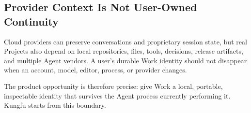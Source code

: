 \subsection{Provider Context Is Not User-Owned Continuity}

Cloud providers can preserve conversations and proprietary session state, but
real Projects also depend on local repositories, files, tools, decisions,
release artifacts, and multiple Agent vendors. A user's durable Work identity
should not disappear when an account, model, editor, process, or provider
changes.

The product opportunity is therefore precise: give Work a local, portable,
inspectable identity that survives the Agent process currently performing it.
Kungfu starts from this boundary.
